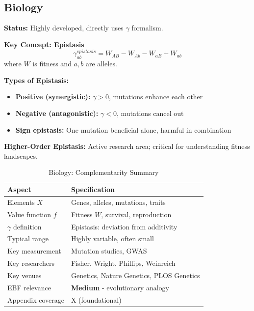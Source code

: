 \subsection{Biology}
\label{sec:bio}

\begin{tcolorbox}[colback=green!5!white,colframe=green!75!black,title=\textbf{Biology: Epistasis and Genetic Interactions}]

\textbf{Status:} Highly developed, directly uses $\gamma$ formalism.

\textbf{Key Concept: Epistasis}
\begin{equation}
\gamma^{epistasis}_{ab} = W_{AB} - W_{Ab} - W_{aB} + W_{ab}
\end{equation}
where $W$ is fitness and $a,b$ are alleles.

\textbf{Types of Epistasis:}
\begin{itemize}[noitemsep]
    \item \textbf{Positive (synergistic):} $\gamma > 0$, mutations enhance each other
    \item \textbf{Negative (antagonistic):} $\gamma < 0$, mutations cancel out
    \item \textbf{Sign epistasis:} One mutation beneficial alone, harmful in combination
\end{itemize}

\textbf{Higher-Order Epistasis:}
Active research area; critical for understanding fitness landscapes.

\end{tcolorbox}

\begin{table}[h]
\centering
\caption{Biology: Complementarity Summary}
\label{tab:bio-summary}
\renewcommand{\arraystretch}{1.3}
\small
\begin{tabular}{@{}ll@{}}
\toprule
\textbf{Aspect} & \textbf{Specification} \\
\midrule
Elements $X$ & Genes, alleles, mutations, traits \\
Value function $f$ & Fitness $W$, survival, reproduction \\
$\gamma$ definition & Epistasis: deviation from additivity \\
Typical range & Highly variable, often small \\
Key measurement & Mutation studies, GWAS \\
Key researchers & Fisher, Wright, Phillips, Weinreich \\
Key venues & Genetics, Nature Genetics, PLOS Genetics \\
EBF relevance & \textbf{Medium} - evolutionary analogy \\
Appendix coverage & X (foundational) \\
\bottomrule
\end{tabular}
\end{table}

